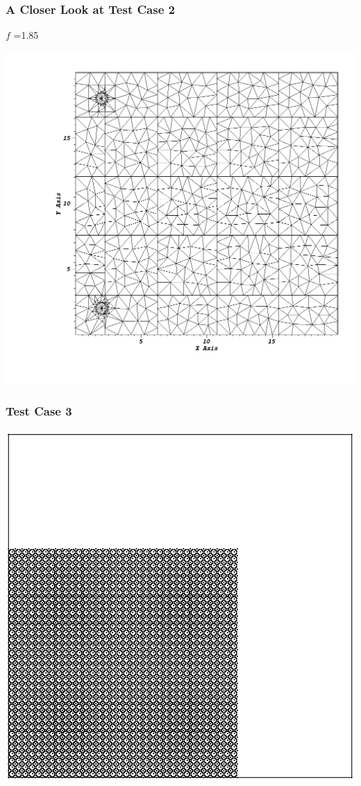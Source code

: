 \documentclass[]{beamer}
\begin{document}
\begin{frame}[t]\frametitle{A Closer Look at Test Case 2}
\begin{minipage}{0.15\textwidth}
\begin{footnotesize}
$f$ =1.85
\end{footnotesize}
\end{minipage}
\begin{minipage}{0.8\textwidth}
\centering
\includegraphics[scale=0.22]{figures/sameside_after.png}
\end{minipage}
\end{frame}

\begin{frame}[t]\frametitle{Test Case 3}
\centering
\includegraphics[scale = 0.4]{figures/lattice-12-shifted-eps-converted-to.pdf}
\end{frame}
\end{document}
